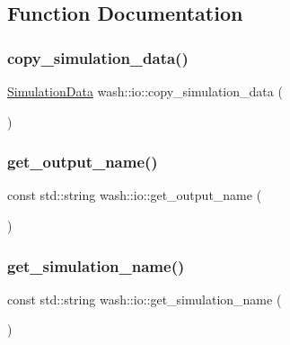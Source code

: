 \subsection{Function Documentation}
\mbox{\label{namespacewash_1_1io_aa9be91ca55f718793aa2e38512d6bdab}} 
\subsubsection{\texorpdfstring{copy\+\_\+simulation\+\_\+data()}{copy\_simulation\_data()}}
{\footnotesize\ttfamily \mbox{\hyperlink{structwash_1_1io_1_1SimulationData}{Simulation\+Data}} wash\+::io\+::copy\+\_\+simulation\+\_\+data (\begin{DoxyParamCaption}{ }\end{DoxyParamCaption})}

\mbox{\label{namespacewash_1_1io_af034a23a15be4666c01bc18c86a45e3e}} 
\subsubsection{\texorpdfstring{get\+\_\+output\+\_\+name()}{get\_output\_name()}}
{\footnotesize\ttfamily const std\+::string wash\+::io\+::get\+\_\+output\+\_\+name (\begin{DoxyParamCaption}{ }\end{DoxyParamCaption})}

\mbox{\label{namespacewash_1_1io_a8976ca6dfe3e6332440f2627928db7f9}} 
\subsubsection{\texorpdfstring{get\+\_\+simulation\+\_\+name()}{get\_simulation\_name()}}
{\footnotesize\ttfamily const std\+::string wash\+::io\+::get\+\_\+simulation\+\_\+name (\begin{DoxyParamCaption}{ }\end{DoxyParamCaption})}

